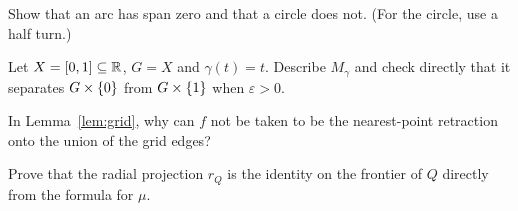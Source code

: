 \begin{exercise}
Show that an arc has span zero and that a circle does not. (For the circle, use a half turn.)
\end{exercise}

\begin{exercise}
Let $X=[0,1]\subseteq\mathbb{R}$, $G=X$ and $\gamma(t)=t$. Describe $M_\gamma$ and check directly that it separates $G\times\left\{ 0 \right\}$ from $G\times\left\{ 1 \right\}$
when $\varepsilon>0$.
\end{exercise}

\begin{exercise}
In Lemma~\ref{lem:grid}, why can $f$ not be taken to be the nearest-point retraction onto the union of the grid edges?
\end{exercise}

\begin{exercise}
Prove that the radial projection $r_Q$ is the identity on the frontier of $Q$ directly from the formula for $\mu$.
\end{exercise}
